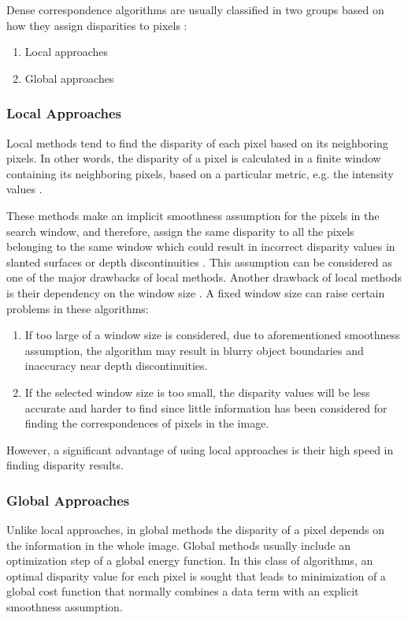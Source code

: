 Dense correspondence algorithms are usually classified in two groups based on how they assign
disparities to pixels \cite{sze11}:
\begin{enumerate}
\item Local approaches
\item Global approaches
\end{enumerate}

\subsubsection{Local Approaches} 

Local methods tend to find the disparity of each pixel based on its neighboring pixels. In
other words, the disparity of a pixel is calculated in a finite window containing its neighboring pixels, based on a particular metric, e.g. the intensity values \cite{sch02}.

These methods make an implicit smoothness assumption for the pixels in the search
window, and therefore, assign the same disparity to all the pixels belonging to the same window which could result in incorrect disparity values in slanted surfaces or
depth discontinuities \cite{hirsch02}. This assumption can be considered as one of the major drawbacks of local methods.
Another drawback of local methods is their dependency on the window size \cite{sch02}. A fixed window size can raise certain problems in these algorithms:
\begin{enumerate}
\item If too large of a window size is considered, due to aforementioned smoothness assumption, the algorithm may result in blurry object boundaries and inaccuracy near depth discontinuities.
\item If the selected window size is too small, the disparity values will be less accurate and harder to find since little information has been considered for 
finding the correspondences of pixels in the image.
\end{enumerate}
However, a significant advantage of using local approaches is their high speed in finding disparity results.

\subsubsection{Global Approaches}
Unlike local approaches, in global methods the disparity of a pixel depends on the information in
the whole image. Global methods usually include an optimization step of a global energy
function\cite{roy98,bobi99,boyk01,hong10}. In this class of algorithms, an optimal disparity value for each pixel is sought that leads to minimization of a global cost
function that normally combines a data term with an explicit smoothness assumption.

